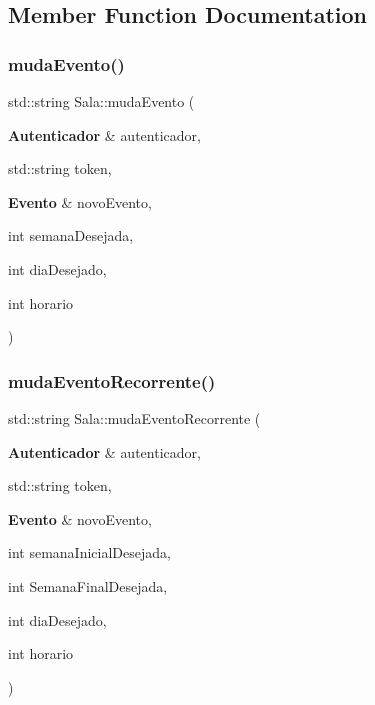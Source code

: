 \subsection{Member Function Documentation}
\mbox{\label{class_sala_a82547a0442165d8e223a7d093edd3fe8}} 
\subsubsection{muda\+Evento()}
{\footnotesize\ttfamily std\+::string Sala\+::muda\+Evento (\begin{DoxyParamCaption}\item[{\textbf{ Autenticador} \&}]{autenticador,  }\item[{std\+::string}]{token,  }\item[{\textbf{ Evento} \&}]{novo\+Evento,  }\item[{int}]{semana\+Desejada,  }\item[{int}]{dia\+Desejado,  }\item[{int}]{horario }\end{DoxyParamCaption})\hspace{0.3cm}{\ttfamily [inline]}}

\mbox{\label{class_sala_a9e3232be7e92a3928bbf32950f6e6c8c}} 
\subsubsection{muda\+Evento\+Recorrente()}
{\footnotesize\ttfamily std\+::string Sala\+::muda\+Evento\+Recorrente (\begin{DoxyParamCaption}\item[{\textbf{ Autenticador} \&}]{autenticador,  }\item[{std\+::string}]{token,  }\item[{\textbf{ Evento} \&}]{novo\+Evento,  }\item[{int}]{semana\+Inicial\+Desejada,  }\item[{int}]{Semana\+Final\+Desejada,  }\item[{int}]{dia\+Desejado,  }\item[{int}]{horario }\end{DoxyParamCaption})\hspace{0.3cm}{\ttfamily [inline]}}

\mbox{\label{class_sala_a19a29808625fc03b2567066a1a7ac8ea}} 
